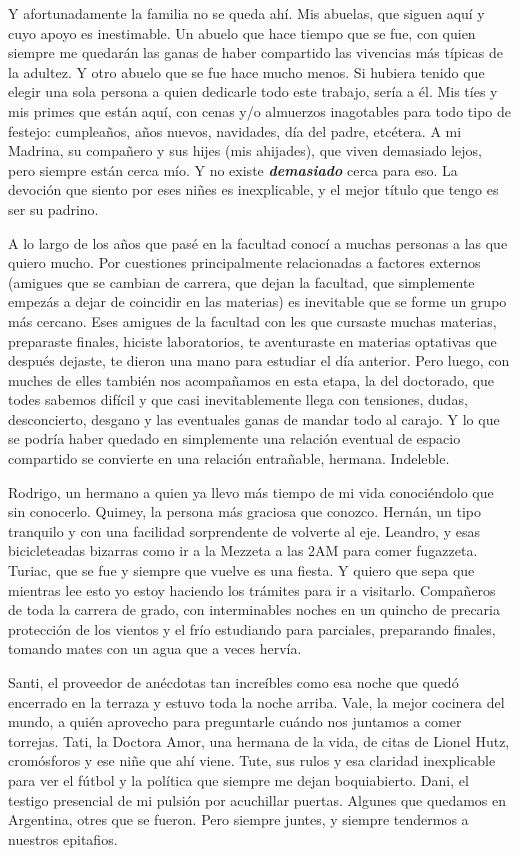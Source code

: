 Y afortunadamente la familia no se queda ahí.
Mis abuelas, que siguen aquí y cuyo apoyo es inestimable.
Un abuelo que hace tiempo que se fue, con quien siempre me quedarán las ganas de haber compartido las vivencias más típicas de la adultez.
Y otro abuelo que se fue hace mucho menos.
Si hubiera tenido que elegir una sola persona a quien dedicarle todo este trabajo, sería a él.
Mis tíes y mis primes que están aquí, con cenas y/o almuerzos inagotables para todo tipo de festejo: cumpleaños, años nuevos, navidades, día del padre, etcétera.
A mi Madrina, su compañero y sus hijes (mis ahijades), que viven demasiado lejos, pero siempre están cerca mío.
Y no existe \textit{\textbf{demasiado}} cerca para eso.
La devoción que siento por eses niñes es inexplicable, y el mejor título que tengo es ser su padrino.

A lo largo de los años que pasé en la facultad conocí a muchas personas a las que quiero mucho.
Por cuestiones principalmente relacionadas a factores externos (amigues que se cambian de carrera, que dejan la facultad, que simplemente empezás a dejar de coincidir en las materias) es inevitable que se forme un grupo más cercano.
Eses amigues de la facultad con les que cursaste muchas materias, preparaste finales, hiciste laboratorios, te aventuraste en materias optativas que después dejaste, te dieron una mano para estudiar el día anterior.
Pero luego, con muches de elles también nos acompañamos en esta etapa, la del doctorado, que todes sabemos difícil y que casi inevitablemente llega con tensiones, dudas, desconcierto, desgano y las eventuales ganas de mandar todo al carajo.
Y lo que se podría haber quedado en simplemente una relación eventual de espacio compartido se convierte en una relación entrañable, hermana.
Indeleble.

Rodrigo, un hermano a quien ya llevo más tiempo de mi vida conociéndolo que sin conocerlo.
Quimey, la persona más graciosa que conozco.
Hernán, un tipo tranquilo y con una facilidad sorprendente de volverte al eje.
Leandro, y esas bicicleteadas bizarras como ir a la Mezzeta a las 2AM para comer fugazzeta.
Turiac, que se fue y siempre que vuelve es una fiesta.
Y quiero que sepa que mientras lee esto yo estoy haciendo los trámites para ir a visitarlo.
Compañeros de toda la carrera de grado, con interminables noches en un quincho de precaria protección de los vientos y el frío estudiando para parciales, preparando finales, tomando mates con un agua que a veces hervía.

Santi, el proveedor de anécdotas tan increíbles como esa noche que quedó encerrado en la terraza y estuvo toda la noche arriba.
Vale, la mejor cocinera del mundo, a quién aprovecho para preguntarle cuándo nos juntamos a comer torrejas.
Tati, la Doctora Amor, una hermana de la vida, de citas de Lionel Hutz, cromósforos y ese niñe que ahí viene.
Tute, sus rulos y esa claridad inexplicable para ver el fútbol y la política que siempre me dejan boquiabierto.
Dani, el testigo presencial de mi pulsión por acuchillar puertas.
Algunes que quedamos en Argentina, otres que se fueron.
Pero siempre juntes, y siempre tendermos a nuestros epitafios.

